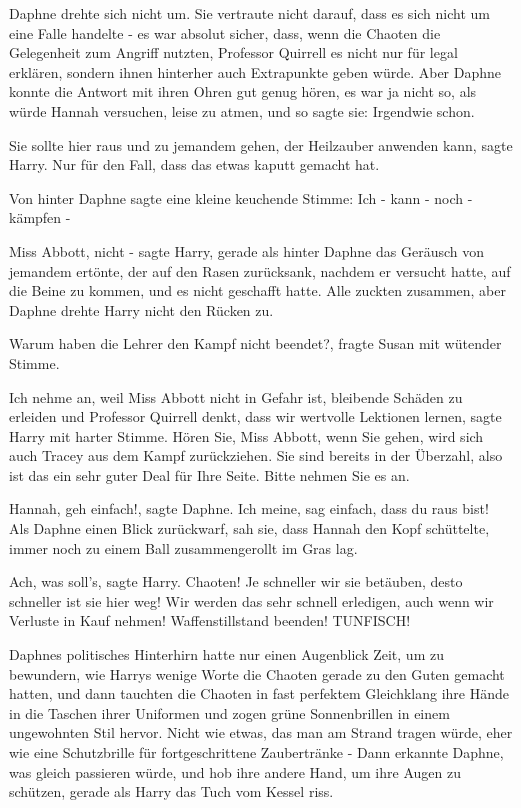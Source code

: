 Daphne drehte sich nicht um. Sie vertraute nicht darauf, dass es sich nicht um
eine Falle handelte - es war absolut sicher, dass, wenn die Chaoten die
Gelegenheit zum Angriff nutzten, Professor Quirrell es nicht nur für legal
erklären, sondern ihnen hinterher auch Extrapunkte geben würde. Aber Daphne
konnte die Antwort mit ihren Ohren gut genug hören, es war ja nicht so, als
würde Hannah versuchen, leise zu atmen, und so sagte sie: \glqq Irgendwie
schon.\grqq{}

\glqq Sie sollte hier raus und zu jemandem gehen, der Heilzauber anwenden
kann\grqq{}, sagte Harry. \glqq Nur für den Fall, dass das etwas kaputt gemacht
hat.\grqq{}

Von hinter Daphne sagte eine kleine keuchende Stimme: \glqq Ich - kann - noch -
kämpfen -\grqq{}

\glqq Miss Abbott, nicht -\grqq{} sagte Harry, gerade als hinter Daphne das
Geräusch von jemandem ertönte, der auf den Rasen zurücksank, nachdem er versucht
hatte, auf die Beine zu kommen, und es nicht geschafft hatte. Alle zuckten
zusammen, aber Daphne drehte Harry nicht den Rücken zu.

\glqq Warum haben die Lehrer den Kampf nicht beendet?\grqq{}, fragte Susan mit
wütender Stimme.

\glqq Ich nehme an, weil Miss Abbott nicht in Gefahr ist, bleibende Schäden zu
erleiden und Professor Quirrell denkt, dass wir wertvolle Lektionen
lernen\grqq{}, sagte Harry mit harter Stimme. \glqq Hören Sie, Miss Abbott, wenn
Sie gehen, wird sich auch Tracey aus dem Kampf zurückziehen. Sie sind bereits in
der Überzahl, also ist das ein sehr guter Deal für Ihre Seite. Bitte nehmen Sie
es an.\grqq{}

\glqq Hannah, geh einfach!\grqq{}, sagte Daphne. \glqq Ich meine, sag einfach,
dass du raus bist!\grqq{} Als Daphne einen Blick zurückwarf, sah sie, dass
Hannah den Kopf schüttelte, immer noch zu einem Ball zusammengerollt im Gras
lag.

\glqq Ach, was soll's\grqq{}, sagte Harry. \glqq Chaoten! Je schneller wir sie
betäuben, desto schneller ist sie hier weg! Wir werden das sehr schnell
erledigen, auch wenn wir Verluste in Kauf nehmen! Waffenstillstand beenden!
TUNFISCH!\grqq{}

Daphnes politisches Hinterhirn hatte nur einen Augenblick Zeit, um zu bewundern,
wie Harrys wenige Worte die Chaoten gerade zu den Guten gemacht hatten, und dann
tauchten die Chaoten in fast perfektem Gleichklang ihre Hände in die Taschen
ihrer Uniformen und zogen grüne Sonnenbrillen in einem ungewohnten Stil hervor.
Nicht wie etwas, das man am Strand tragen würde, eher wie eine Schutzbrille für
fortgeschrittene Zaubertränke - Dann erkannte Daphne, was gleich passieren
würde, und hob ihre andere Hand, um ihre Augen zu schützen, gerade als Harry das
Tuch vom Kessel riss.

